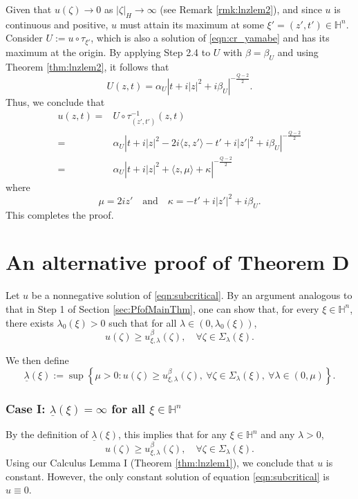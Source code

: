 \documentclass[reqno]{amsart}
\theoremstyle{definition}
\theoremstyle{remark}
\numberwithin{equation}{section}
\begin{document}
Given that $u(\zeta) \to 0$ as $|\zeta|_H \to \infty$ (see Remark \ref{rmk:lnzlem2}), and since $u$ is continuous and positive, $u$ must attain its maximum at some $\xi'=(z',t') \in \mathbb{H}^n$. Consider $U := u \circ \tau_{\xi'}$, which is also a solution of \eqref{eqn:cr_yamabe} and has its maximum at the origin. By applying Step 2.4 to $U$ with $\beta = \beta_U$ and using Theorem \ref{thm:lnzlem2}, it follows that
\[
U(z,t) = \alpha_U \left|t + i|z|^2 +i\beta_U\right|^{-\frac{Q-2}{2}}.
\]
Thus, we conclude that 
\begin{align*}
u(z,t) =& U \circ \tau_{(z',t')}^{-1} (z,t) \\
=& \alpha_U \left|t+i|z|^2-2i\langle z, z'\rangle - t' 
+ i\left|z' \right|^2 + i \beta_U \right|^{-\frac {Q-2}{2}}\\
=& \alpha_U \left|t+i|z|^2 + \langle z, \mu \rangle + \kappa \right|^{-\frac {Q-2}{2}}
\end{align*}
where
\[
\mu = 2iz'\quad \text{and} \quad
\kappa = -t' + i\left|z' \right|^2 + i \beta_U.
\]
This completes the proof.


\section{An alternative proof of Theorem D}
\label{sec:PfofMaOu}

Let $u$ be a nonnegative solution of \eqref{eqn:subcritical}. 
By an argument analogous to that in Step 1 of Section \ref{sec:PfofMainThm}, one can show that, for every $\xi \in \mathbb{H}^{n}$, there exists $\lambda_{0}(\xi)>0$ such that for all $\lambda \in (0, \lambda_{0}(\xi))$,
\[
u(\zeta) \geq u_{\xi,\lambda}^{\beta}(\zeta), \quad \forall \zeta \in \Sigma_{\lambda}(\xi).
\]

We then define
\[
\underline{\lambda}(\xi) := \sup \left\{ \mu > 0 : u(\zeta) \geq u_{\xi,\lambda}^{\beta}(\zeta),\ \forall \zeta \in \Sigma_{\lambda}(\xi),\ \forall \lambda \in (0, \mu) \right\}.
\]

\subsubsection*{Case I: $\underline{\lambda}(\xi) = \infty$ for all $\xi \in \mathbb{H}^n$}
By the definition of $\underline{\lambda}(\xi)$, this implies that for any $\xi \in \mathbb{H}^n$ and any $\lambda > 0$,
\[
u(\zeta) \geq u_{\xi,\lambda}^{\beta}(\zeta), \quad \forall \zeta \in \Sigma_{\lambda}(\xi).
\]
Using our Calculus Lemma I (Theorem \ref{thm:lnzlem1}), we conclude that $u$ is constant. However, the only constant solution of equation \eqref{eqn:subcritical} is $u \equiv 0$.
\end{document}
